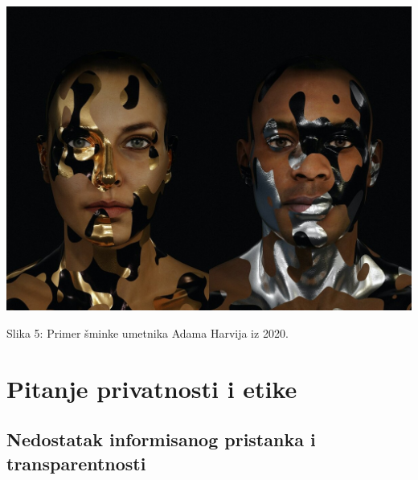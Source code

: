\documentclass{article}
\begin{document}
\begin{center}
\begin{minipage}{0.5\textwidth}
\includegraphics[width=\textwidth]{sminka2.jpg}
\end{minipage}

\vspace{0.5cm}

Slika 5: Primer šminke umetnika Adama Harvija iz 2020.
\end{center}

\section{Pitanje privatnosti i etike}

\subsection{Nedostatak informisanog pristanka i transparentnosti}
\end{document}
